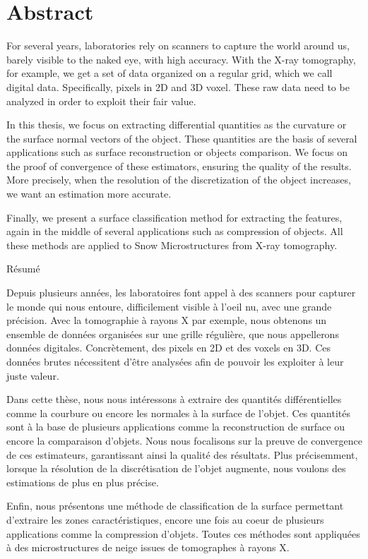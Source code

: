 %
\chapter*{Abstract}
\label{sec:abstract}
\vspace*{-10mm}

For several years, laboratories rely on scanners to capture the world around us,
barely visible to the naked eye, with high accuracy. With the X-ray tomography,
for example, we get a set of data organized on a regular grid, which we call
digital data. Specifically, pixels in 2D and 3D voxel. These raw data need to be
analyzed in order to exploit their fair value.

In this thesis, we focus on extracting differential quantities as the curvature
or the surface normal vectors of the object. These quantities are the basis of
several applications such as surface reconstruction or objects comparison. We
focus on the proof of convergence of these estimators, ensuring the quality of
the results. More precisely, when the resolution of the discretization of the
object increases, we want an estimation more accurate.

Finally, we present a surface classification method for extracting the features,
again in the middle of several applications such as compression of objects. All
these methods are applied to Snow Microstructures from X-ray tomography.

\vspace*{20mm}

{Résumé}
\label{sec:abstract-french}
\vspace*{5mm}

Depuis plusieurs années, les laboratoires font appel à des scanners pour
capturer le monde qui nous entoure, difficilement visible à l’oeil nu, avec une
grande précision. Avec la tomographie à rayons X par exemple, nous obtenons un
ensemble de données organisées sur une grille régulière, que nous appellerons
données digitales. Concrètement, des pixels en 2D et des voxels en 3D. Ces
données brutes nécessitent d’être analysées afin de pouvoir les exploiter à leur
juste valeur.

Dans cette thèse, nous nous intéressons à extraire des quantités différentielles
comme la courbure ou encore les normales à la surface de l’objet. Ces quantités
sont à la base de plusieurs applications comme la reconstruction de surface ou
encore la comparaison d’objets. Nous nous focalisons sur la preuve de
convergence de ces estimateurs, garantissant ainsi la qualité des résultats.
Plus précisemment, lorsque la résolution de la discrétisation de l’objet
augmente, nous voulons des estimations de plus en plus précise.

Enfin, nous présentons une méthode de classification de la surface permettant
d’extraire les zones caractéristiques, encore une fois au coeur de plusieurs
applications comme la compression d’objets. Toutes ces méthodes sont appliquées à
des microstructures de neige issues de tomographes à rayons X.
